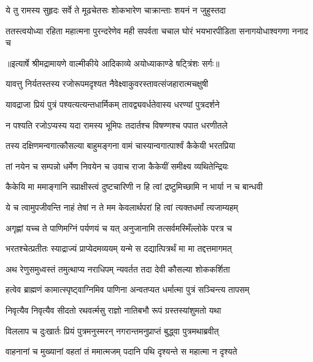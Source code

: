 \twolineshloka
{ये तु रामस्य सुहृदः सर्वे ते मूढचेतसः}
{शोकभारेण चाक्रान्ताः शयनं न जुहुस्तदा} %

\fourlineindentedshloka
{ततस्त्वयोध्या रहिता महात्मना}
{पुरन्दरेणेव मही सपर्वता}
{चचाल घोरं भयभारपीडिता}
{सनागयोधाश्वगणा ननाद च} %


{॥इत्यार्षे श्रीमद्रामायणे वाल्मीकीये आदिकाव्ये अयोध्याकाण्डे षट्त्रिंशः सर्गः॥}


\twolineshloka
{यावत्तु निर्यतस्तस्य रजोरूपमदृश्यत}
{नैवेक्ष्वाकुवरस्तावत्संजहारात्मचक्षुषी} %

\twolineshloka
{यावद्राजा प्रियं पुत्रं पश्यत्यत्यन्तधार्मिकम्}
{तावद्व्यवर्धतेवास्य धरण्यां पुत्रदर्शने} %

\twolineshloka
{न पश्यति रजोऽप्यस्य यदा रामस्य भूमिपः}
{तदार्तश्च विषण्णश्च पपात धरणीतले} %

\twolineshloka
{तस्य दक्षिणमन्वगात्कौसल्या बाहुमङ्गना}
{वामं चास्यान्वगात्पार्श्वं कैकेयी भरतप्रिया} %

\twolineshloka
{तां नयेन च सम्पन्नो धर्मेण निवयेन च}
{उवाच राजा कैकेयीं समीक्ष्य व्यथितेन्द्रियः} %

\twolineshloka
{कैकेयि मा ममाङ्गानि स्प्राक्षीस्त्वं दुष्टचारिणी}
{न हि त्वां द्रष्टुमिच्छामि न भार्या न च बान्धवी} %

\twolineshloka
{ये च त्वामुपजीवन्ति नाहं तेषां न ते मम}
{केवलार्थपरां हि त्वां त्यक्तधर्मां त्यजाम्यहम्} %

\twolineshloka
{अगृह्णां यच्च ते पाणिमग्निं पर्यणयं च यत्}
{अनुजानामि तत्सर्वमस्मिँल्लोके परत्र च} %

\twolineshloka
{भरतश्चेत्प्रतीतः स्याद्राज्यं प्राप्येदमव्ययम्}
{यन्मे स दद्यात्पित्रर्थं मा मा तद्दत्तमागमत्} %

\twolineshloka
{अथ रेणुसमुध्वस्तं तमुत्थाप्य नराधिपम्}
{न्यवर्तत तदा देवी कौसल्या शोककर्शिता} %

\twolineshloka
{हत्वेव ब्राह्मणं कामात्स्पृष्ट्वाग्निमिव पाणिना}
{अन्वतप्यत धर्मात्मा पुत्रं सञ्चिन्त्य तापसम्} %

\twolineshloka
{निवृत्यैव निवृत्यैव सीदतो रथवर्त्मसु}
{राज्ञो नातिबभौ रूपं ग्रस्तस्यांशुमतो यथा} %

\twolineshloka
{विललाप च दुःखार्तः प्रियं पुत्रमनुस्मरन्}
{नगरान्तमनुप्राप्तं बुद्ध्वा पुत्रमथाब्रवीत्} %

\twolineshloka
{वाहनानां च मुख्यानां वहतां तं ममात्मजम्}
{पदानि पथि दृश्यन्ते स महात्मा न दृश्यते} %

